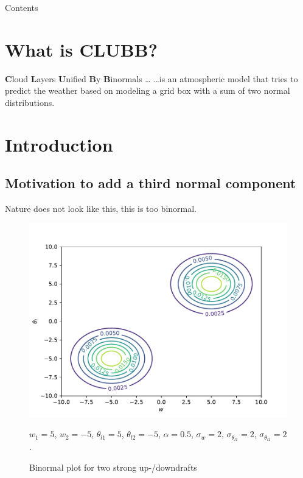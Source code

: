 \documentclass[10pt]{beamer}
\title{\mytitle}
\author[\myauthor]{\myauthor}
\institute[UWM]{University of Wisconsin Milwaukee}
\date[May 3, 2024]{May 3, 2024}
\numberwithin{equation}{section}
\begin{document}
    \frame{\titlepage}

    \begin{frame}{Contents}
        \tableofcontents[hideallsubsections]
    \end{frame}


    \section{What is CLUBB?}\label{sec:what-is-clubb?}

    \begin{frame}{\textbf{C}loud \textbf{L}ayers \textbf{U}nified \textbf{B}y \textbf{B}inormals \ldots}
        \ldots is an atmospheric model that tries to predict the weather
        based on modeling a grid box with a sum of two normal distributions.
    \end{frame}


    \section{Introduction}\label{sec:introduction}

    \subsection{Motivation to add a third normal component}
    \label{subsec:motivation-to-add-a-third-normal-component}

    \begin{frame}
        \begin{large}
            Nature does not look like this, this is too binormal.
        \end{large}
        \begin{figure}[!htb]
            \centering
            \includegraphics[width=.5\textwidth]{include/figures/plot1}
            \caption{Binormal plot for two strong up-/downdrafts}
            \label{fig:plot1}
            $w_1 = 5$, $w_2 = -5$, $\theta_{l1} = 5$, $\theta_{l2} = -5$,
            $\alpha = 0.5$, $\sigma_w = 2$, $\sigma_{\theta_{l1}} = 2$, $\sigma_{\theta_{l1}} = 2$.
        \end{figure}
    \end{frame}
\end{document}
